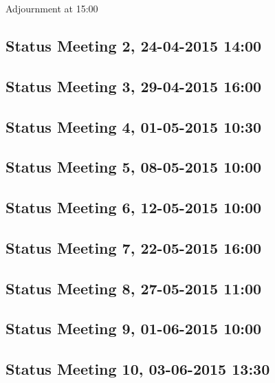 Adjournment at 15:00

\subsection{Status Meeting 2, 24-04-2015 14:00}


\subsection{Status Meeting 3, 29-04-2015 16:00}


\subsection{Status Meeting 4, 01-05-2015 10:30}


\subsection{Status Meeting 5, 08-05-2015 10:00}


\subsection{Status Meeting 6, 12-05-2015 10:00}


\subsection{Status Meeting 7, 22-05-2015 16:00}


\subsection{Status Meeting 8, 27-05-2015 11:00}


\subsection{Status Meeting 9, 01-06-2015 10:00}


\subsection{Status Meeting 10, 03-06-2015 13:30}
